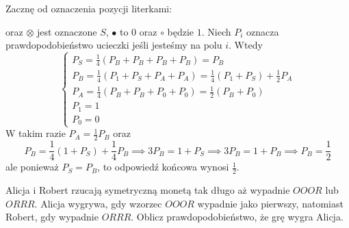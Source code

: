 \begin{solution}
Zacznę od oznaczenia pozycji literkami:
\begin{center}\end{center}
  oraz $\otimes$ jest oznaczone $S$, $\bullet$ to $0$ oraz $\circ$ będzie $1$. Niech $P_i$ oznacza prawdopodobieństwo ucieczki jeśli jesteśmy na polu $i$. Wtedy
  $$
    \begin{cases}
      P_S=\frac{1}{4}(P_B+P_B+P_B+P_B)=P_B\\ 
      P_B=\frac{1}{4}(P_1+P_S+P_A+P_A)=\frac{1}{4}(P_1+P_S)+\frac{1}{2}P_A\\ 
      P_A=\frac{1}{4}(P_B+P_B+P_0+P_0)=\frac{1}{2}(P_B+P_0)\\ 
      P_1=1\\ 
      P_0=0
    \end{cases}
  $$
  W takim razie $P_A=\frac{1}{2}P_B$ oraz
  $$
  P_B=\frac{1}{4}(1+P_S)+\frac{1}{4}P_B\implies 3P_B=1+P_S\implies 3P_B=1+P_B\implies P_B=\frac{1}{2}
  $$
  ale ponieważ $P_S=P_B$, to odpowiedź końcowa wynosi $\frac{1}{2}$.
\end{solution}

\begin{problem}
  Alicja i Robert rzucają symetryczną monetą tak długo aż wypadnie $OOOR$ lub $ORRR$. Alicja wygrywa, gdy wzorzec $OOOR$ wypadnie jako pierwszy, natomiast Robert, gdy wypadnie $ORRR$. Oblicz prawdopodobieństwo, że grę wygra Alicja.
\end{problem}


